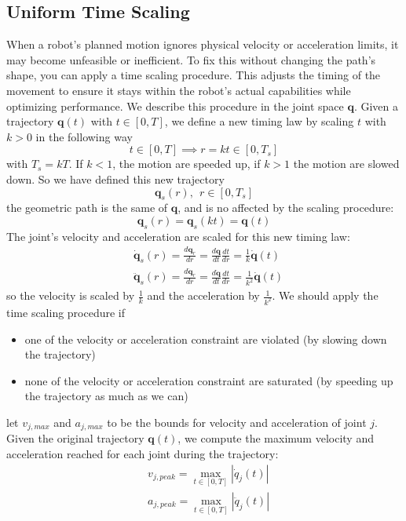 \documentclass[10pt, letterpaper]{report}
\begin{document}
\subsection{Uniform Time Scaling}
When a robot's planned motion ignores physical velocity or acceleration limits, it may become unfeasible or inefficient. To fix this without changing the path's shape, you can apply a time scaling procedure. This adjusts the timing of the movement to ensure it stays within the robot's actual capabilities while optimizing performance.
We describe this procedure in the joint space $\mathbf q$. Given a trajectory $\mathbf q(t)$ with $t\in[0,T]$, we define a new timing law by scaling $t$ with $k>0$ in the following way\begin{equation}
    t\in [0,T]\implies r=kt\in [0,T_s]
\end{equation}
with $T_s=kT$. If $k<1$, the motion are speeded up, if $k>1$ the motion are slowed down. So we have defined this new trajectory\begin{equation}
    \mathbf q_s(r), \ \ r\in [0,T_s]
\end{equation}
the geometric path is the same of $\mathbf q$, and is no affected by the scaling procedure:\begin{equation}
    \mathbf q_s(r)=\mathbf q_s(kt)=\mathbf q(t)
\end{equation}
The joint's velocity and acceleration are scaled for this new timing law:\begin{align}
    &\dot{\mathbf q}_s(r)=\frac{d\mathbf q_r}{dr}=\frac{d\mathbf q}{dt}\frac{dt}{dr}=\frac{1}{k}\dot{\mathbf q}(t)\\
    &\ddot{\mathbf q}_s(r)=\frac{d\dot{\mathbf q}_r}{dr}=\frac{d\dot{\mathbf q}}{dt}\frac{dt}{dr}=\frac{1}{k^2}\dot{\mathbf q}(t)
\end{align}
so the velocity is scaled by $\frac{1}{k}$ and the acceleration by $\frac{1}{k^2}$. We should apply the time scaling procedure if\begin{itemize}
    \item one of the velocity or acceleration constraint are violated (by slowing down the trajectory)
    \item none of the velocity or acceleration constraint are saturated (by speeding up the trajectory as much as we can)
\end{itemize}
let $v_{j,max}$ and $a_{j,max}$ to be the bounds for velocity and acceleration of joint $j$. Given the original trajectory $\mathbf q(t)$, we compute the maximum velocity and acceleration reached for each joint during the trajectory:\begin{align}
    &v_{j,peak}=\max_{t\in [0,T]}|\dot q_j(t)|\\
    &a_{j,peak}=\max_{t\in [0,T]}|\ddot q_j(t)|
\end{align}
\end{document}
